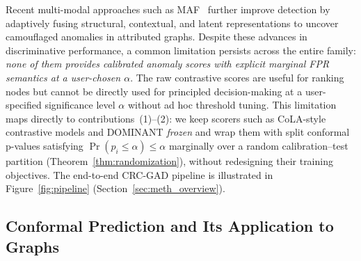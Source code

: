 \documentclass[a4paper]{cas-dc}
\theoremstyle{definition}
\begin{document}
Recent multi-modal approaches such as MAF~\cite{gusare2026kbsmaf} further improve detection by adaptively fusing structural, contextual, and latent representations to uncover camouflaged anomalies in attributed graphs.  Despite these advances in discriminative performance, a common limitation persists across the entire family: \emph{none of them provides calibrated anomaly scores with explicit marginal FPR semantics at a user-chosen $\alpha$}.  The raw contrastive scores are useful for ranking nodes but cannot be directly used for principled decision-making at a user-specified significance level $\alpha$ without ad hoc threshold tuning.  This limitation maps directly to contributions~(1)--(2): we keep scorers such as CoLA-style contrastive models and DOMINANT \emph{frozen} and wrap them with split conformal p-values satisfying $\Pr(p_i \leq \alpha) \leq \alpha$ marginally over a random calibration--test partition (Theorem~\ref{thm:randomization}), without redesigning their training objectives.  The end-to-end CRC-GAD pipeline is illustrated in Figure~\ref{fig:pipeline} (Section~\ref{sec:meth_overview}).

\subsection{Conformal Prediction and Its Application to Graphs}
\label{sec:rw_cp}
\end{document}
